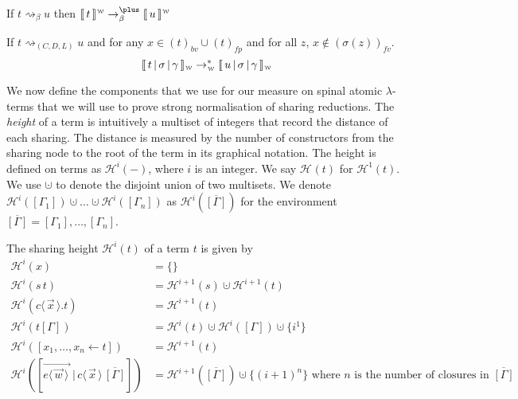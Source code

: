 \documentclass[a4paper,UKenglish,cleveref, autoref]{lipics-v2019}
\newcommand{\fv}[1]{(#1)_{fv}}
\newcommand{\bv}[1]{(#1)_{bv}}
\newcommand{\fp}[1]{(#1)_{fp}}
\newcommand{\set}[1]{ \{ #1 \} }
\newcommand{\app}[2]{#1 \, #2}
\newcommand{\fake}[3]{#1 \langle \, #2 \, \rangle . #3}
\newcommand{\share}[3]{#1 [#2 \leftarrow #3]}
\newcommand{\dist}[5]{#1 [ #2 \, \vert \, \fakedist{#4}{#5} \, #3 ]}
\newcommand{\fakedist}[2]{#1 \langle \, #2 \, \rangle}
\newcommand{\vecdist}[2]{\overrightarrow{\fakedist{#1}{#2} \,}}
\newcommand{\weaksymbol}{\mbox{\tiny $\mathcal{W}$}}
\newcommand{\readweakwmap}[3]{\llbracket \, #1 \, \vert \, #2 \, \vert \, #3  \, \rrbracket_{\weaksymbol} }
\newcommand{\composeweak}[1]{\llbracket \, #1 \, \rrbracket^{\weaksymbol}}
\newcommand{\height}[2]{\mathcal{H}^{#1}(#2)}
\begin{document}

\begin{lemma}
\label{lem:sharepreservebeta}
	If $t \rightsquigarrow_{\beta} u$ then $\composeweak{t} \rightarrow^{\plus}_{\beta} \composeweak{u}$
\end{lemma}

\begin{lemma}
\label{theo:sharepreserve}
	If $t \rightsquigarrow_{(C, D, L)} u$ and for any $x \in \bv{t} \cup \fp{t}$ and for all $z$, $x \not\in \fv{\sigma(z)}$.  $$\readweakwmap{t}{\sigma}{\gamma} \rightarrow^{*}_{\weaksymbol} \readweakwmap{u}{\sigma}{\gamma}$$

\end{lemma}

We now define the components that we use for our measure on spinal atomic $\lambda$-terms that we will use to prove strong normalisation of sharing reductions. The \emph{height} of a term is intuitively a multiset of integers that record the distance of each sharing. The distance is measured by the number of constructors from the sharing node to the root of the term in its graphical notation. The height is defined on terms as $\height{i}{-}$, where $i$ is an integer. We say $\height{}{t}$ for $\height{1}{t}$. We use $\cupdot$ to denote the disjoint union of two multisets. We denote $\height{i}{[\Gamma_{1}]} \cupdot \dots \cupdot \height{i}{[\Gamma_{n}]}$ as $\height{i}{\overline{[\Gamma]}}$ for the environment $\overline{[\Gamma]} = [\Gamma_{1}], \dots, [\Gamma_{n}]$.

\begin{definition}
The sharing height $\height{i}{t}$ of a term $t$ is given by
\begingroup
\allowdisplaybreaks
\begin{align*}
	\height{i}{x} &= \set{} \\
	\height{i}{ \app{s}{t} } &= \height{i+1}{s} \cupdot \height{i+1}{t} \\
	\height{i}{\fake{c}{\vec{x}}{t}} &= \height{i + 1}{t} \\
	\height{i}{t[\Gamma]} &= \height{i}{t} \cupdot \height{i}{[\Gamma]} \cupdot \set{i^{1}} \\
	\height{i}{\share{}{x_{1}, \dots, x_{n}}{t}} &= \height{i+1}{t}\\
	\height{i}{\dist{}{\vecdist{e}{\vec{w}}}{\overline{[\Gamma]}}{c}{\vec{x}}} &= \height{i + 1}{\overline{[\Gamma]}} \cupdot \set{(i + 1)^{n}} \text{ where $n$ is the number of closures in $\overline{[\Gamma]}$}
\end{align*}
\endgroup
\end{definition}
\end{document}
